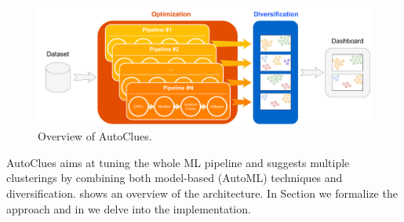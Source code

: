 
\begin{figure}[t]
    \centering
    \includegraphics[scale=.26]{chapters/data-centric/unsupervised/img/approach.pdf}
    \caption{Overview of AutoClues.}
    \label{clustering-fig:overview}
\end{figure}

%
AutoClues aims at tuning the whole ML pipeline and suggests multiple clusterings by combining both model-based (AutoML) techniques and diversification.
 shows an overview of the architecture. In Section  we formalize the approach and in  we delve into the implementation.

